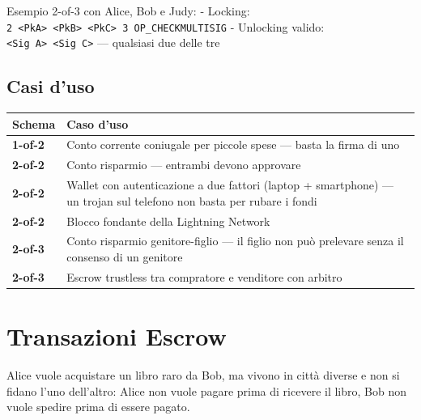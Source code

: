 \documentclass[
  italian,
  openany]{book}
\newcounter{none} %
\begin{document}
Esempio 2-of-3 con Alice, Bob e Judy: - Locking:
\texttt{2\ \textless{}PkA\textgreater{}\ \textless{}PkB\textgreater{}\ \textless{}PkC\textgreater{}\ 3\ OP\_CHECKMULTISIG}
- Unlocking valido:
\texttt{\textless{}Sig\ A\textgreater{}\ \textless{}Sig\ C\textgreater{}}
--- qualsiasi due delle tre

\subsection{Casi d'uso}\label{casi-duso}

{\def\LTcaptype{none} %
\begin{longtable}[]{@{}
  >{\raggedright\arraybackslash}p{}
  >{\raggedright\arraybackslash}p{}@{}}
\toprule\noalign{}
\begin{minipage}[b]{\linewidth}\raggedright
Schema
\end{minipage} & \begin{minipage}[b]{\linewidth}\raggedright
Caso d'uso
\end{minipage} \\
\midrule\noalign{}
\endhead
\bottomrule\noalign{}
\endlastfoot
\textbf{1-of-2} & Conto corrente coniugale per piccole spese --- basta
la firma di uno \\
\textbf{2-of-2} & Conto risparmio --- entrambi devono approvare \\
\textbf{2-of-2} & Wallet con autenticazione a due fattori (laptop +
smartphone) --- un trojan sul telefono non basta per rubare i fondi \\
\textbf{2-of-2} & Blocco fondante della Lightning Network \\
\textbf{2-of-3} & Conto risparmio genitore-figlio --- il figlio non può
prelevare senza il consenso di un genitore \\
\textbf{2-of-3} & Escrow trustless tra compratore e venditore con
arbitro \\
\end{longtable}
}

\section{Transazioni Escrow}\label{transazioni-escrow}

Alice vuole acquistare un libro raro da Bob, ma vivono in città diverse
e non si fidano l'uno dell'altro: Alice non vuole pagare prima di
ricevere il libro, Bob non vuole spedire prima di essere pagato.
\end{document}
